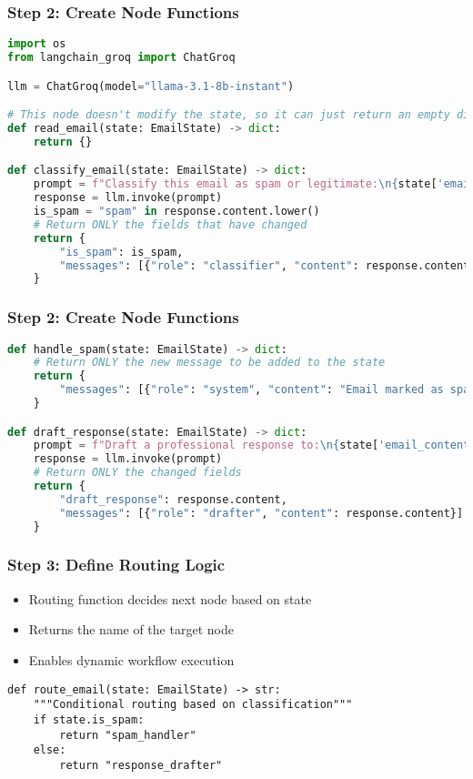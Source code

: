 \begin{frame}[fragile]\frametitle{Step 2: Create Node Functions}
      \begin{lstlisting}[language=Python, basicstyle=\tiny]
import os
from langchain_groq import ChatGroq

llm = ChatGroq(model="llama-3.1-8b-instant") 

# This node doesn't modify the state, so it can just return an empty dictionary
def read_email(state: EmailState) -> dict:
    return {}

def classify_email(state: EmailState) -> dict:
    prompt = f"Classify this email as spam or legitimate:\n{state['email_content']}\nRespond with only 'spam' or 'legitimate'."
    response = llm.invoke(prompt)
    is_spam = "spam" in response.content.lower()
    # Return ONLY the fields that have changed
    return {
        "is_spam": is_spam,
        "messages": [{"role": "classifier", "content": response.content}]
    }
      \end{lstlisting}
\end{frame}

\begin{frame}[fragile]\frametitle{Step 2: Create Node Functions}
      \begin{lstlisting}[language=Python, basicstyle=\tiny]
def handle_spam(state: EmailState) -> dict:
    # Return ONLY the new message to be added to the state
    return {
        "messages": [{"role": "system", "content": "Email marked as spam and moved to junk."}]
    }

def draft_response(state: EmailState) -> dict:
    prompt = f"Draft a professional response to:\n{state['email_content']}"
    response = llm.invoke(prompt)
    # Return ONLY the changed fields
    return {
        "draft_response": response.content,
        "messages": [{"role": "drafter", "content": response.content}]
    }
      \end{lstlisting}
\end{frame}

\begin{frame}[fragile]\frametitle{Step 3: Define Routing Logic}

      \begin{itemize}
        \item Routing function decides next node based on state
        \item Returns the name of the target node
        \item Enables dynamic workflow execution
      \end{itemize}
	  
      \begin{lstlisting}
def route_email(state: EmailState) -> str:
    """Conditional routing based on classification"""
    if state.is_spam:
        return "spam_handler"
    else:
        return "response_drafter"
      \end{lstlisting}
     
\end{frame}

